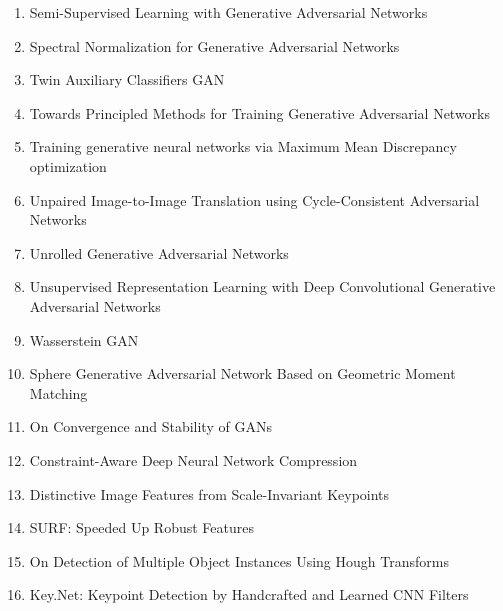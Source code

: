 \documentclass[acmlarge]{acmart}
\begin{document}
\begin{enumerate}
	\item Semi-Supervised Learning with Generative Adversarial Networks \cite{odena2016semisupervised} 

	\item Spectral Normalization for Generative Adversarial Networks \cite{miyato2018spectral} 

	\item Twin Auxiliary Classifiers GAN \cite{gong2019twin} 

	\item Towards Principled Methods for Training Generative Adversarial Networks \cite{arjovsky2017principled} 

	\item Training generative neural networks via Maximum Mean Discrepancy optimization \cite{dziugaite2015training} 

	\item Unpaired Image-to-Image Translation using Cycle-Consistent Adversarial Networks \cite{zhu2017unpaired} 

	\item Unrolled Generative Adversarial Networks \cite{metz2016unrolled} 

	\item Unsupervised Representation Learning with Deep Convolutional Generative Adversarial Networks \cite{radford2015unsupervised} 

	\item Wasserstein GAN \cite{arjovsky2017wasserstein} 

	\item Sphere Generative Adversarial Network Based on Geometric Moment Matching \cite{Park2019SphereGA} 

	\item On Convergence and Stability of GANs \cite{Kodali2018OnCA} 

	\item Constraint-Aware Deep Neural Network Compression \cite{Chen2018ConstraintAwareDN} 

	\item Distinctive Image Features from Scale-Invariant Keypoints \cite{LoweDavid2004DistinctiveIF} 

	\item SURF: Speeded Up Robust Features \cite{Bay2006SURFSU} 

	\item On Detection of Multiple Object Instances Using Hough Transforms \cite{Barinova2010OnDO} 

	\item Key.Net: Keypoint Detection by Handcrafted and Learned CNN Filters \cite{Laguna2019KeyNetKD} 


\end{enumerate}
\end{document}
